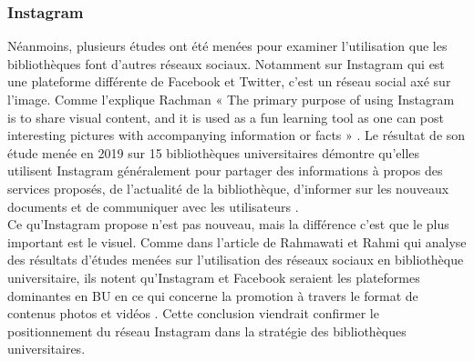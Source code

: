 \documentclass[a4paper,11pt]{article} %
\begin{document}
\subsubsection{Instagram}

Néanmoins, plusieurs études ont été menées pour examiner l’utilisation que les bibliothèques font d’autres réseaux sociaux. Notamment sur Instagram qui est une plateforme différente de Facebook et Twitter, c’est un réseau social axé sur l'image. Comme l’explique Rachman « The primary purpose of using Instagram is to share visual content, and it is used as 
a fun learning tool as one can post interesting pictures with accompanying information or facts
» \citep{rachman2021examinant,}. Le résultat de son étude menée en 2019 sur 15 bibliothèques universitaires démontre
qu’elles utilisent Instagram généralement pour partager des informations à propos des services 
proposés, de l’actualité de la bibliothèque, d’informer sur les nouveaux documents et de 
communiquer avec les utilisateurs \citep{himes1954value,}.\\
Ce qu’Instagram propose n’est pas nouveau, mais la différence c’est que le plus important est le visuel. Comme dans l’article de Rahmawati et Rahmi qui analyse des résultats d’études menées sur l’utilisation des réseaux sociaux en bibliothèque universitaire, ils notent qu’Instagram et Facebook seraient les plateformes dominantes en BU en ce qui concerne la promotion à travers le format de contenus photos et vidéos \citep{rahmawati2021academic,}. Cette conclusion viendrait confirmer le positionnement du réseau Instagram dans la stratégie des bibliothèques universitaires.
\end{document}
